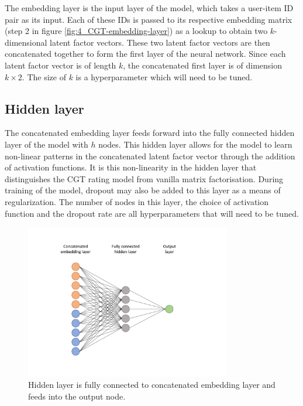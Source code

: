 The embedding layer is the input layer of the model, which takes a user-item ID pair as its input. Each of these IDs is passed to its respective embedding matrix (step 2 in figure \ref{fig:4_CGT-embedding-layer}) as a lookup to obtain two $k$-dimensional latent factor vectors. These two latent factor vectors are then concatenated together to form the first layer of the neural network. Since each latent factor vector is of length $k$, the concatenated first layer is of dimension $k\times2$. The size of $k$ is a hyperparameter which will need to be tuned.

\subsection{Hidden layer}
The concatenated embedding layer feeds forward into the fully connected hidden layer of the model with $h$ nodes. This hidden layer allows for the model to learn non-linear patterns in the concatenated latent factor vector through the addition of activation functions. It is this non-linearity in the hidden layer that distinguishes the CGT rating model from vanilla matrix factorisation. During training of the model, dropout may also be added to this layer as a means of regularization. The number of nodes in this layer, the choice of activation function and the dropout rate are all hyperparameters that will need to be tuned.

\begin{figure}[H]
\centering
\includegraphics[width=0.8\textwidth]{Figures/4_CGT-hidden.pdf}
\decoRule
\caption[Rating model hidden layer]{Hidden layer is fully connected to concatenated embedding layer and feeds into the output node.}
\label{fig:4_CGT-hidden-layer}
\end{figure}

